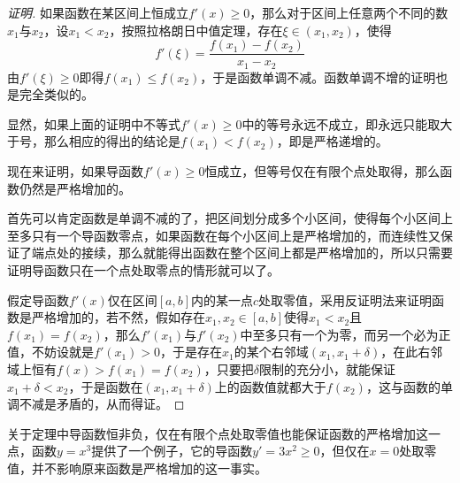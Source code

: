 \begin{proof}[证明]
  如果函数在某区间上恒成立$f'(x) \geqslant 0$，那么对于区间上任意两个不同的数$x_1$与$x_2$，设$x_1<x_2$，按照拉格朗日中值定理，存在$\xi \in (x_1,x_2)$，使得
  \[ f'(\xi) = \frac{f(x_1)-f(x_2)}{x_1-x_2} \]
  由$f'(\xi) \geqslant 0$即得$f(x_1) \leqslant f(x_2)$，于是函数单调不减。函数单调不增的证明也是完全类似的。

  显然，如果上面的证明中不等式$f'(x) \geqslant 0$中的等号永远不成立，即永远只能取大于号，那么相应的得出的结论是$f(x_1)<f(x_2)$，即是严格递增的。

  现在来证明，如果导函数$f'(x) \geqslant 0$恒成立，但等号仅在有限个点处取得，那么函数仍然是严格增加的。

  首先可以肯定函数是单调不减的了，把区间划分成多个小区间，使得每个小区间上至多只有一个导函数零点，如果函数在每个小区间上是严格增加的，而连续性又保证了端点处的接续，那么就能得出函数在整个区间上都是严格增加的，所以只需要证明导函数只在一个点处取零点的情形就可以了。

  假定导函数$f'(x)$仅在区间$[a,b]$内的某一点$c$处取零值，采用反证明法来证明函数是严格增加的，若不然，假如存在$x_1,x_2 \in [a,b]$使得$x_1<x_2$且$f(x_1)=f(x_2)$，那么$f'(x_1)$与$f'(x_2)$中至多只有一个为零，而另一个必为正值，不妨设就是$f'(x_1)>0$，于是存在$x_1$的某个右邻域$(x_1,x_1+\delta)$，在此右邻域上恒有$f(x)>f(x_1)=f(x_2)$，只要把$\delta$限制的充分小，就能保证$x_1+\delta<x_2$，于是函数在$(x_1,x_1+\delta)$上的函数值就都大于$f(x_2)$，这与函数的单调不减是矛盾的，从而得证。
\end{proof}

\begin{example}
  关于定理中导函数恒非负，仅在有限个点处取零值也能保证函数的严格增加这一点，函数$y=x^3$提供了一个例子，它的导函数$y'=3x^2 \geqslant 0$，但仅在$x=0$处取零值，并不影响原来函数是严格增加的这一事实。
\end{example}

